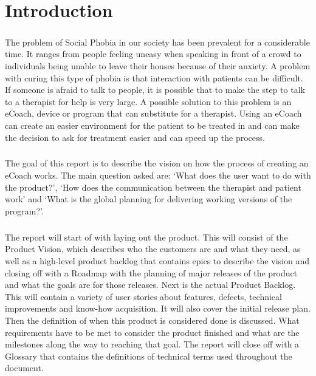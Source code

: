 \chapter{Introduction}

\paragraph{}
The problem of Social Phobia in our society has been prevalent for a considerable time. It ranges from people feeling uneasy when speaking in front of a crowd to individuals being unable to leave their houses because of their anxiety. 
A problem with curing this type of phobia is that interaction with patients can be difficult. If someone is afraid to talk to people, it is possible that to make the step to talk to a therapist for help is very large. A possible solution to this problem is an eCoach, device or program that can substitute for a therapist. Using an eCoach can create an easier environment for the patient to be treated in and can make the decision to ask for treatment easier and can speed up the process.
\paragraph{}
The goal of this report is to describe the vision on how the process of creating an eCoach works. The main question asked are: ‘What does the user want to do with the product?’, ‘How does the communication between the therapist and patient work’ and ‘What is the global planning for delivering working versions of the program?’.
\paragraph{}
The report will start of with laying out the product. This will consist of the Product Vision, which describes who the customers are and what they need, as well as a high-level product backlog that contains epics to describe the vision and closing off with a Roadmap with the planning of major releases of the product and what the goals are for those releases.
Next is the actual Product Backlog. This will contain a variety of user stories about features, defects, technical improvements and know-how acquisition. It will also cover the initial release plan.
Then the definition of when this product is considered done is discussed. What requirements have to be met to consider the product finished and what are the milestones along the way to reaching that goal.
The report will close off with a Glossary that contains the definitions of technical terms used throughout the document.